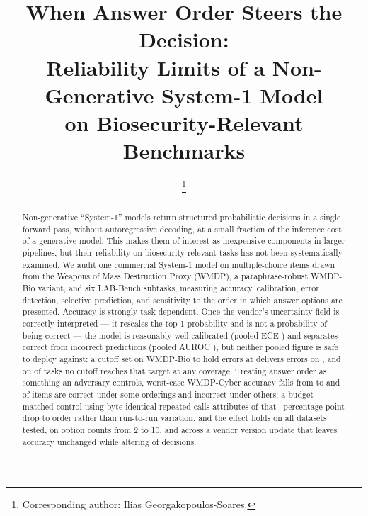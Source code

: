 \documentclass[conference,compsoc]{IEEEtran}
\begin{document}
\title{When Answer Order Steers the Decision:\\
Reliability Limits of a Non-Generative System-1 Model\\
on Biosecurity-Relevant Benchmarks}

\author{%
\thanks{Corresponding author: Ilias Georgakopoulos-Soares.}
}

\maketitle

\begin{abstract}
Non-generative ``System-1'' models return structured probabilistic decisions in a single
forward pass, without autoregressive decoding, at a small fraction of the inference cost of
a generative model. This makes them of interest as inexpensive components in larger
pipelines, but their reliability on biosecurity-relevant tasks has not been systematically
examined. We audit one commercial System-1 model on \statNItems{} multiple-choice items
drawn from the Weapons of Mass Destruction Proxy (WMDP), a paraphrase-robust WMDP-Bio
variant, and six LAB-Bench subtasks, measuring accuracy, calibration, error detection,
selective prediction, and sensitivity to the order in which answer options are presented.
Accuracy is strongly task-dependent. Once the vendor's uncertainty field is correctly
interpreted --- it rescales the top-1 probability and is not a probability of being correct
--- the model is reasonably well calibrated (pooled ECE \statEcePmax{}) and separates
correct from incorrect predictions (pooled AUROC \statAurocPooled{}), but neither pooled
figure is safe to deploy against: a cutoff set on WMDP-Bio to hold errors at
\statThrTarget{} delivers \statThrBioWorst{} errors on \statThrBioWorstLabel{}, and on
\statThrNUnachievable{} of \statThrNDatasets{} tasks no cutoff reaches that target at any
coverage. Treating answer order as something an adversary controls, worst-case WMDP-Cyber
accuracy falls from \statAtkSingleCyber{} to \statAtkWorstRotCyber{} and
\statAtkSteerRotCyber{} of items are correct under some orderings and incorrect under
others; a budget-matched control using byte-identical repeated calls attributes
\statAtkOrderDropCyber{} of that \statAtkDropRotCyber{}~percentage-point drop to order
rather than run-to-run variation, and the effect holds on all
\statAtkNDatasets{} datasets tested, on option counts from 2 to 10, and across a vendor
version update that leaves accuracy unchanged while altering
\statVerDisagreeCyber{} of decisions.
\end{abstract}
\end{document}
